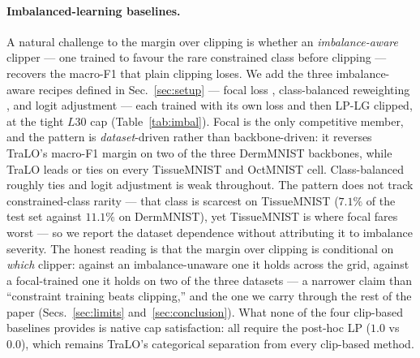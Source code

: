 \documentclass[10pt]{article}
\begin{document}
{
\paragraph{Imbalanced-learning baselines.}
A natural challenge to the margin over clipping is whether an \emph{imbalance-aware}
clipper --- one trained to favour the rare constrained class before clipping ---
recovers the macro-F1 that plain clipping loses. We add the three imbalance-aware recipes
defined in Sec.~\ref{sec:setup} --- focal loss \citep{lin2017focal}, class-balanced
reweighting \citep{cui2019class}, and logit adjustment \citep{menon2020long} --- each
trained with its own loss and then LP-LG clipped, at the tight $L30$ cap
(Table~\ref{tab:imbal}). Focal is the only competitive member, and the pattern is
\emph{dataset}-driven rather than backbone-driven: it reverses TraLO's macro-F1 margin on
two of the three DermMNIST backbones, while TraLO leads or ties on every TissueMNIST and
OctMNIST cell. Class-balanced roughly ties and logit adjustment is weak throughout. The
pattern does not track constrained-class rarity --- that class is scarcest on TissueMNIST
($7.1\%$ of the test set against $11.1\%$ on DermMNIST), yet TissueMNIST is where focal
fares worst --- so we report the dataset dependence without attributing it to imbalance
severity. The honest reading is that the margin over clipping is conditional on
\emph{which} clipper: against an imbalance-unaware one it holds across the grid, against a
focal-trained one it holds on two of the three datasets{ --- a narrower claim than
``constraint training beats clipping,'' and the one we carry through the rest of the paper} (Secs.~\ref{sec:limits}
and~\ref{sec:conclusion}).
What none of the four clip-based baselines provides is
native cap satisfaction: all require the post-hoc LP ($1.0$ vs $0.0$), which remains
TraLO's categorical separation from every clip-based method.}
\end{document}
